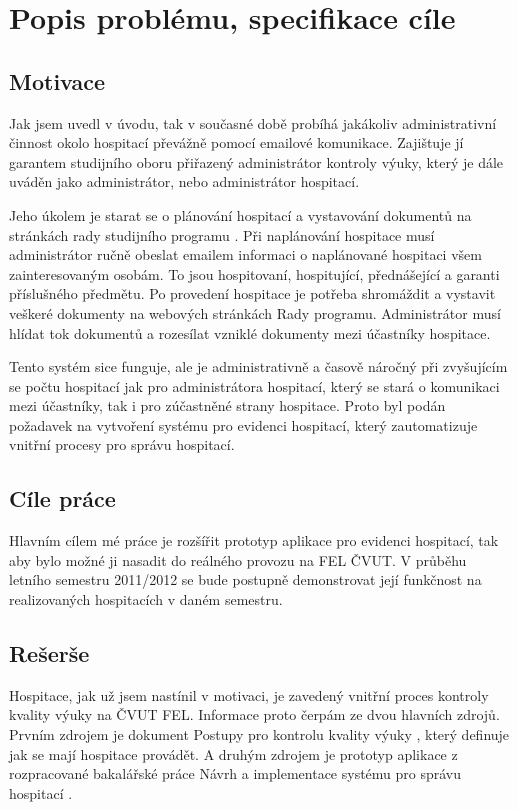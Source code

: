 \chapter{Popis problému, specifikace cíle}
\section{Motivace}
Jak jsem uvedl v úvodu, tak v současné době probíhá jakákoliv administrativní činnost okolo hospitací převážně pomocí emailové komunikace.  Zajištuje jí garantem studijního oboru přiřazený administrátor kontroly výuky, který je dále  uváděn jako administrátor, nebo administrátor hospitací. 

Jeho úkolem je starat se o plánování hospitací a vystavování dokumentů na stránkách rady studijního programu \cite{kvalitavyukyweb}. Při naplánování hospitace musí administrátor ručně obeslat emailem informaci o naplánované hospitaci všem zainteresovaným osobám. To jsou hospitovaní, hospitující, přednášející a garanti příslušného předmětu. Po provedení hospitace je potřeba shromáždit a vystavit veškeré dokumenty na webových stránkách Rady programu. Administrátor musí hlídat tok dokumentů a rozesílat vzniklé dokumenty mezi účastníky hospitace.

Tento systém sice funguje, ale je administrativně a časově náročný při zvyšujícím se počtu hospitací jak pro administrátora hospitací, který se stará o komunikaci mezi účastníky, tak i pro zúčastněné strany hospitace. Proto byl podán požadavek na vytvoření systému pro evidenci hospitací, který zautomatizuje vnitřní procesy pro správu hospitací.

\section{Cíle práce}
Hlavním cílem mé práce je rozšířit prototyp aplikace pro evidenci hospitací, tak aby bylo možné ji nasadit do reálného provozu na FEL ČVUT. V průběhu letního semestru 2011/2012 se bude postupně demonstrovat její funkčnost na realizovaných hospitacích v daném semestru.

\section{Rešerše}
Hospitace, jak už jsem nastínil v motivaci, je zavedený vnitřní proces kontroly kvality výuky na ČVUT FEL. Informace proto čerpám ze dvou hlavních zdrojů. Prvním zdrojem je dokument Postupy pro kontrolu kvality výuky \cite{postupy}, který definuje jak se mají hospitace provádět. A druhým zdrojem je prototyp aplikace z rozpracované bakalářské práce Návrh a implementace systému pro správu hospitací \cite{prototyp_documentace}.

